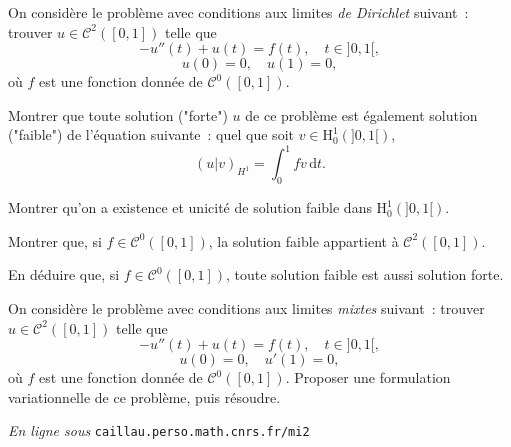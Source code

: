 \documentclass[11pt,a4paper]{article}
\def\H{\mathrm{H}}
\def\CC{\mathscr{C}}
\def\d{\mathrm{d}}
\begin{document}
\begin{Exercice} On consid\`ere le probl\`eme avec conditions aux limites \emph{de
Dirichlet} suivant~: trouver $u \in \CC^2([0,1])$ telle que
\[ -u''(t)+u(t) = f(t),\quad t \in ]0,1[, \]
\[ u(0)=0,\quad u(1)=0, \]
o\`u $f$ est une fonction donn\'ee de $\CC^0([0,1])$.

\begin{Question} Montrer que toute solution ("forte") $u$ de ce probl\`eme
est \'egalement solution ("faible") de l'\'equation suivante~: quel que soit $v \in
\H^1_0(]0,1[)$,
\[ (u|v)_{H^1} = \int_0^1 fv\,\d t. \]
\end{Question}

\begin{Question} Montrer qu'on a existence et unicit\'e de solution faible dans
$\H^1_0(]0,1[)$.
\end{Question}

\begin{Question} Montrer que, si $f \in \CC^0([0,1])$, la solution faible appartient
\`a $\CC^2([0,1])$.
\end{Question}

\begin{Question} En d\'eduire que, si $f \in \CC^0([0,1])$, toute solution faible est
aussi solution forte.
\end{Question}

\end{Exercice} \vspace*{1em}

\begin{Exercice} On consid\`ere le probl\`eme avec conditions aux limites
\emph{mixtes} suivant~: trouver $u \in \CC^2([0,1])$ telle que
\[ -u''(t)+u(t) = f(t),\quad t \in ]0,1[, \]
\[ u(0)=0,\quad u'(1)=0, \]
o\`u $f$ est une fonction donn\'ee de $\CC^0([0,1])$. Proposer une formulation
varia\-tionnelle de ce probl\`eme, puis r\'esoudre.

\end{Exercice} \vspace*{1em}

\vfill \begin{flushright}{\footnotesize \emph{En ligne sous}
\texttt{caillau.perso.math.cnrs.fr/mi2}} \end{flushright}
\end{document}
